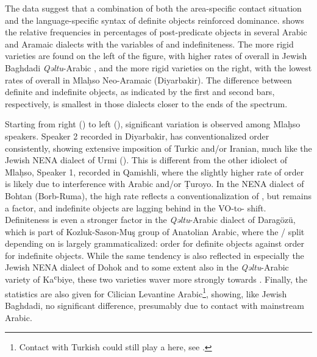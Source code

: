 \documentclass[output=paper,colorlinks,citecolor=brown,draftmode]{langscibook}
\begin{document}
\begin{sloppypar}
The data suggest that a combination of both the area-specific contact situation and the language-specific syntax of definite objects reinforced  dominance.  shows the relative frequencies in percentages of post-predicate objects in several Arabic and Aramaic dialects with the variables of  and indefiniteness. The more rigid  varieties are found on the left of the figure, with higher rates of  overall in Jewish Baghdadi \textit{Qəltu}-Arabic \citep{BarMosheCraevschi2022Arabic}, and the more rigid  varieties on the right, with the lowest rates of  overall in Mlaḥso Neo-Aramaic (Diyarbakir). The difference between definite and indefinite objects, as indicated by the first and second bars, respectively, is smallest in those dialects closer to the ends of the spectrum.

Starting from right () to left (), significant variation is observed among Mlaḥso speakers. Speaker 2 recorded in Diyarbakir, has conventionalized  order consistently, showing extensive imposition of Turkic and/or Iranian, much like the Jewish NENA dialect of Urmi (). This is different from the other idiolect of Mlaḥso, Speaker 1, recorded in Qamishli, where the slightly higher rate of  order is likely due to interference with Arabic and/or Ṭuroyo. In the NENA dialect of Bohtan (Borb-Ruma), the high rate reflects a conventionalization of  , but  remains a factor, and indefinite objects are lagging behind in the VO-to- shift. Definiteness is even a stronger factor in the \textit{Qəltu}-Arabic dialect of Daragözü, which is part of Kozluk-Sason-Muş group of Anatolian Arabic, where the / split depending on  is largely grammaticalized:  order for definite objects against  order for indefinite objects. While the same tendency is also reflected in especially the Jewish NENA dialect of Dohok \citep{Molin2022NEDohok} and to some extent also in the \textit{Qəltu}-Arabic variety of Kaʿbiye, these two varieties waver more strongly towards . Finally, the statistics are also given for Cilician Levantine Arabic\footnote{Contact with Turkish could still play a  here, see \citet{Noorlander2024OVArabi}.}, showing, like Jewish Baghdadi, no significant difference, presumably due to contact with mainstream Arabic.
\end{sloppypar}
\end{document}
